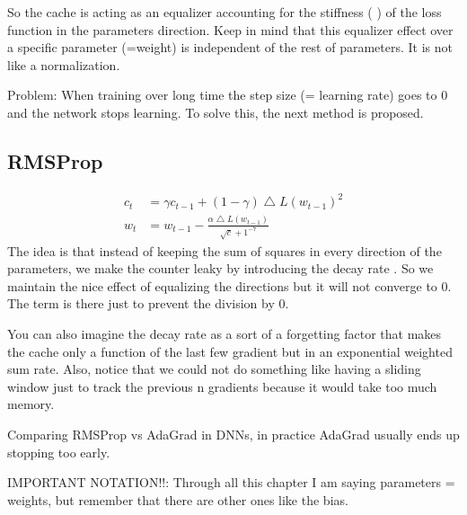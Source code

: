 So the cache is acting as an equalizer accounting for the stiffness ( ) of the loss function in the parameters direction. Keep in mind that this equalizer effect over a specific parameter (=weight) is independent of the rest of parameters. It is not like a normalization.

Problem: When training over long time the step size (= learning rate) goes to 0 and the network stops learning. To solve this, the next method is proposed.

\subsection*{RMSProp}
\begin{equation}
\begin{aligned}
c_t &= \gamma c_{t-1} + (1-\gamma) \bigtriangleup L(w_{t-1})^2 \\
w_t &= w_{t-1} - \frac{\alpha  \bigtriangleup L(w_{t-1})}{\sqrt{c} + 1^{-7}}
\end{aligned}
\end{equation}
The idea is that instead of keeping the sum of squares in every direction of the parameters, we make the counter leaky by introducing the decay rate . So we maintain the nice effect of equalizing the directions but it will not converge to 0. The term  is there just to prevent the division by 0.

You can also imagine the decay rate as a sort of a forgetting factor that makes the cache  only a function of the last few gradient but in an exponential weighted sum rate. Also, notice that we could not do something like having a sliding window just to track the previous n gradients because it would take too much memory.

Comparing RMSProp vs AdaGrad in DNNs, in practice AdaGrad usually ends up stopping too early.

IMPORTANT NOTATION!!: Through all this chapter I am saying parameters = weights, but remember that there are other ones like the bias.

